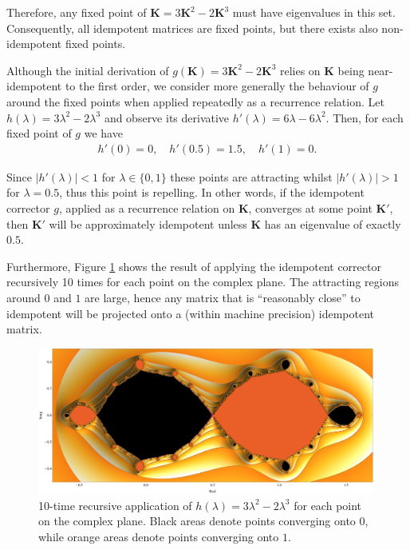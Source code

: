 \documentclass{article}
\theoremstyle{plain}
\theoremstyle{definition}
\theoremstyle{remark}
\newcommand{\vK}{\mathbf{K}}
\begin{document}
Therefore, any fixed point of ${\vK = 3 \vK^2 - 2 \vK^3}$ must have eigenvalues in this set. Consequently, all idempotent matrices are fixed points, but there exists also non-idempotent fixed points.

Although the initial derivation of ${g(\vK) = 3 \vK^2 - 2 \vK^3}$ relies on $\vK$ being near-idempotent to the first order, we consider more generally the behaviour of $g$ around the fixed points when applied repeatedly as a recurrence relation. Let ${h(\lambda) = 3\lambda^2 - 2\lambda^3}$ and observe its derivative ${h'(\lambda) = 6\lambda - 6\lambda^2}$. Then, for each fixed point of $g$ we have
\begin{align}
    h'(0) = 0, \quad h'(0.5) = 1.5, \quad h'(1) = 0.
\end{align}

Since ${|h'(\lambda)| < 1}$ for ${\lambda \in \{0, 1\}}$ these points are attracting whilst ${|h'(\lambda)| > 1}$ for ${\lambda = 0.5}$, thus this point is repelling. In other words, if the idempotent corrector $g$, applied as a recurrence relation on $\vK$, converges at some point $\vK'$, then $\vK'$ will be approximately idempotent unless $\vK$ has an eigenvalue of exactly $0.5$.

Furthermore, Figure \ref{fig:fractal} shows the result of applying the idempotent corrector recursively 10 times for each point on the complex plane. The attracting regions around $0$ and $1$ are large, hence any matrix that is ``reasonably close'' to idempotent will be projected onto a (within machine precision) idempotent matrix.

\begin{figure}[!htp]
    \centering
    \includegraphics[width=0.99\textwidth]{./resources/fractal.pdf}
    \caption{10-time recursive application of $h(\lambda) = 3\lambda^2 - 2\lambda^3$ for each point on the complex plane. Black areas denote points converging onto $0$, while orange areas denote points converging onto $1$.}
    \label{fig:fractal}
\end{figure}
\end{document}
